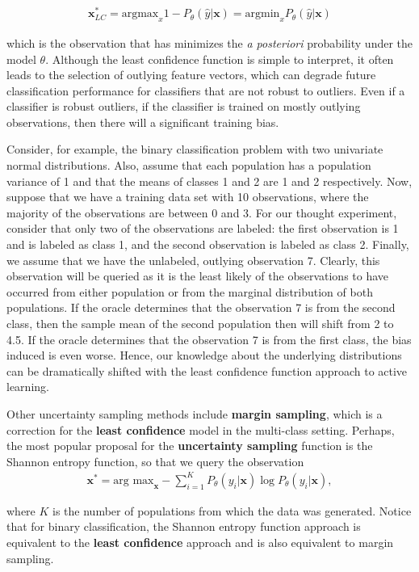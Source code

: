\documentclass[article]{jss}
\begin{document}
\begin{align}
	\bm x^*_{LC} = \text{argmax}_x 1 - P_{\theta}(\widehat{y} | \bm x) = \text{argmin}_x P_{\theta}(\widehat{y} | \bm x)
\end{align}

	which is the observation that has minimizes the \emph{a posteriori} probability under the model $\theta$. Although the least confidence function is simple to interpret, it often leads to the selection of outlying feature vectors, which can degrade future classification performance for classifiers that are not robust to outliers. Even if a classifier is robust outliers, if the classifier is trained on mostly outlying observations, then there will a significant training bias.

	Consider, for example, the binary classification problem with two univariate normal distributions. Also, assume that each population has a population variance of 1 and that the means of classes 1 and 2 are 1 and 2 respectively. Now, suppose that we have a training data set with 10 observations, where the majority of the observations are between 0 and 3. For our thought experiment, consider that only two of the observations are labeled: the first observation is 1 and is labeled as class 1, and the second observation is labeled as class 2. Finally, we assume that we have the unlabeled, outlying observation 7. Clearly, this observation will be queried as it is the least likely of the observations to have occurred from either population or from the marginal distribution of both populations. If the oracle determines that the observation 7 is from the second class, then the sample mean of the second population then will shift from 2 to 4.5. If the oracle determines that the observation 7 is from the first class, the bias induced is even worse. Hence, our knowledge about the underlying distributions can be dramatically shifted with the least confidence function approach to active learning.

	Other uncertainty sampling methods include \textbf{margin sampling}, which is a correction for the \textbf{least confidence} model in the multi-class setting. Perhaps, the most popular proposal for the \textbf{uncertainty sampling} function is the Shannon entropy function, so that we query the observation
\begin{align}
	\bm x^{*} = \text{arg max}_{\bm x} -\sum_{i=1}^K P_{\theta}(y_i | \bm x) \log P_{\theta}(y_i | \bm x),
\end{align}

where $K$ is the number of populations from which the data was generated. Notice that for binary classification, the Shannon entropy function approach is equivalent to the \textbf{least confidence} approach and is also equivalent to margin sampling.
\end{document}
